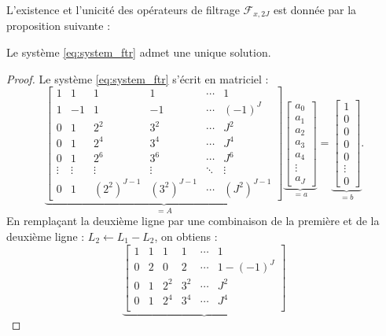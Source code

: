 L'existence et l'unicité des opérateurs de filtrage $\mathcal{F}_{x,2J}$ est donnée par la proposition suivante :

\begin{proposition}
Le système \eqref{eq:system_ftr} admet une unique solution.
\end{proposition}

\begin{proof}
Le système \eqref{eq:system_ftr} s'écrit en matriciel :
\begin{equation}
\underbrace{\begin{bmatrix}
1 & 1 & 1 & 1 & \cdots & 1\\
1 & -1 & 1 & -1 & \cdots & (-1)^J\\
0 & 1 & 2^2 & 3^2 & \cdots & J^2 \\
0 & 1 & 2^4 & 3^4 & \cdots & J^4 \\
0 & 1 & 2^6 & 3^6 & \cdots & J^6 \\
\vdots & \vdots & \vdots & \vdots & \ddots & \vdots \\
0 & 1 & (2^2)^{J-1} & (3^2)^{J-1} & \cdots & (J^2)^{J-1}
\end{bmatrix}}_{= A}
\underbrace{\begin{bmatrix}
a_0 \\ a_1 \\ a_2 \\ a_3 \\ a_4 \\ \vdots \\ a_J
\end{bmatrix}
}_{=a} = \underbrace{\begin{bmatrix}
1 \\ 0 \\ 0 \\ 0 \\ 0 \\  \vdots \\ 0
\end{bmatrix}
}_{= b}.
\end{equation}
En remplaçant la deuxième ligne par une combinaison de la première et de la deuxième ligne : $L_2 \leftarrow L_1 - L_2$, on obtiens :
\begin{equation}
\underbrace{\begin{bmatrix}
1 & 1 & 1 & 1 & \cdots & 1\\
0 & 2 & 0 & 2 & \cdots & 1-(-1)^J\\
0 & 1 & 2^2 & 3^2 & \cdots & J^2 \\
0 & 1 & 2^4 & 3^4 & \cdots & J^4 \\

\end{bmatrix}}
\end{equation}
\end{proof}

